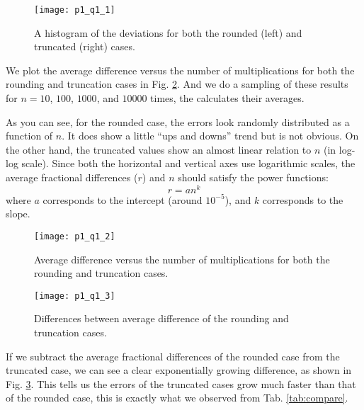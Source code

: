 \begin{figure}
    \centering
    \texttt{[image: p1\_q1\_1]}
    \caption{A histogram of the deviations for both the rounded (left) and
        truncated (right) cases.}
    \label{fig:histogram}
\end{figure}

We plot the average difference versus the number of multiplications for both the
rounding and truncation cases in Fig. \ref{fig:compare_rounding_truncation}.
And we do a sampling of these results for \(n = 10\), \(100\), \(1000\), and \(10000\) times,
the calculates their averages.

As you can see, for the rounded case, the errors look randomly distributed as a function
of \(n\). It does show a little ``ups and downs'' trend but is not obvious.
On the other hand, the truncated values show an almost linear relation to \(n\) (in log-log scale).
Since both the horizontal and vertical axes use logarithmic scales, the average
fractional differences (\(r\)) and \(n\) should satisfy the power functions:
%
\begin{equation}
    r = a n^k
\end{equation}
%
where \(a\) corresponds to the intercept (around \(10^{-5}\)), and \(k\) corresponds to the
slope.

\begin{figure}
    \centering
    \texttt{[image: p1\_q1\_2]}
    \caption{Average difference versus the number of multiplications for both
        the rounding and truncation cases.}
    \label{fig:compare_rounding_truncation}
\end{figure}

\begin{figure}[H]
    \centering
    \texttt{[image: p1\_q1\_3]}
    \caption{Differences between average difference of the rounding and truncation cases.}
    \label{fig:diff_rounding_truncation}
\end{figure}

If we subtract the average fractional differences of the rounded case from the
truncated case, we can see a clear exponentially growing difference, as shown in
Fig. \ref{fig:diff_rounding_truncation}. This tells us the errors of the truncated
cases grow much faster than that of the rounded case, this is exactly what we observed
from Tab. \ref{tab:compare}.

\newpage
